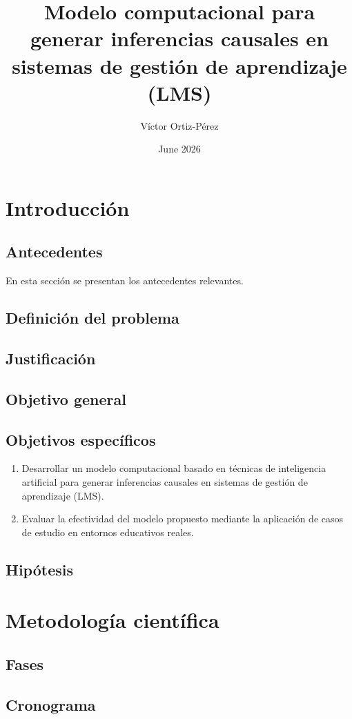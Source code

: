 \documentclass[12pt,letterpaper,spanish]{article}
\title{Modelo computacional para generar inferencias causales en sistemas de gestión de aprendizaje (LMS)}
\author{Víctor Ortiz-Pérez}
\date{June 2026}
\begin{document}

\newpage
\tableofcontents
\newpage

\section{Introducción}
\subsection{Antecedentes}
En esta sección se presentan los antecedentes relevantes.
\subsection{Definición del problema}
\cite{nagai_analysis_2024}
\subsection{Justificación}
\subsection{Objetivo general}
\subsection{Objetivos específicos}
\begin{enumerate}
    \item Desarrollar un modelo computacional basado en técnicas de inteligencia artificial para generar inferencias causales en sistemas de gestión de aprendizaje (LMS).
    \item Evaluar la efectividad del modelo propuesto mediante la aplicación de casos de estudio en entornos educativos reales.
\end{enumerate}
\subsection{Hipótesis}
\newpage

\section{Metodología científica}
\subsection{Fases}
\subsection{Cronograma}
\end{document}
